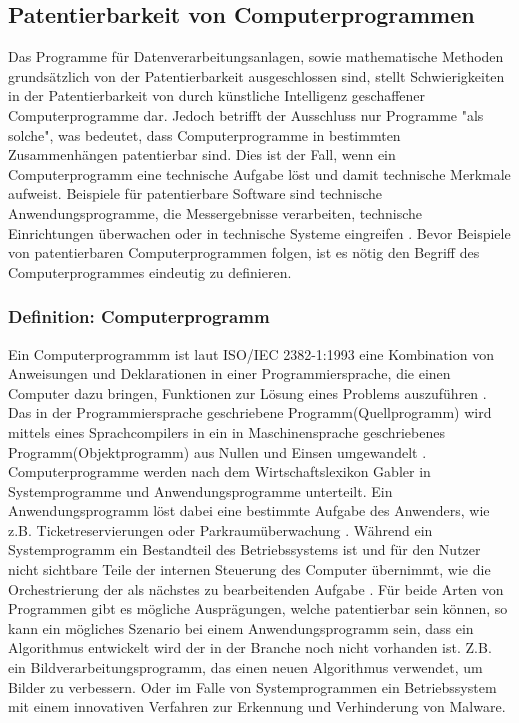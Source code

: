 \subsection{Patentierbarkeit von Computerprogrammen}
Das Programme für Datenverarbeitungsanlagen, sowie mathematische Methoden grundsätzlich
von der Patentierbarkeit ausgeschlossen sind, stellt Schwierigkeiten in der 
Patentierbarkeit von durch künstliche
Intelligenz geschaffener Computerprogramme dar. 
Jedoch betrifft der Ausschluss nur Programme "als solche", 
was bedeutet, 
dass Computerprogramme in bestimmten Zusammenhängen patentierbar sind.
Dies ist der Fall,
wenn ein Computerprogramm eine technische Aufgabe löst
und damit technische Merkmale aufweist.
Beispiele für patentierbare Software sind technische Anwendungsprogramme, 
die Messergebnisse verarbeiten, 
technische Einrichtungen überwachen oder in technische Systeme eingreifen
\cite{RedekerITRechtSchutz}.
Bevor Beispiele von patentierbaren Computerprogrammen folgen, ist es
nötig den Begriff des Computerprogrammes eindeutig zu definieren.
\subsubsection{Definition: Computerprogramm}
Ein Computerprogrammm ist laut ISO/IEC 2382-1:1993 
eine Kombination von Anweisungen und Deklarationen in einer
Programmiersprache, die einen Computer dazu bringen, 
Funktionen zur Lösung eines Problems auszuführen 
\cite{instituteofelectricalandelectronicsengineersinc.ISO47652010}.
Das in der Programmiersprache geschriebene Programm(Quellprogramm) wird 
mittels eines Sprachcompilers in ein in Maschinensprache geschriebenes 
Programm(Objektprogramm) aus Nullen und Einsen umgewandelt \cite{WasIstProgramm}.
Computerprogramme werden nach dem Wirtschaftslexikon Gabler in Systemprogramme
und Anwendungsprogramme unterteilt. 
Ein Anwendungsprogramm löst dabei eine bestimmte Aufgabe des Anwenders, 
wie z.B. Ticketreservierungen oder Parkraumüberwachung 
\cite{lackesDefinitionAnwendungsprogramm}. 
Während ein Systemprogramm ein Bestandteil des Betriebssystems ist und 
für den Nutzer nicht sichtbare Teile der internen Steuerung des Computer übernimmt,
wie die Orchestrierung der als nächstes 
zu bearbeitenden Aufgabe \cite{lackesDefinitionSystemprogramm}.
Für beide Arten von Programmen gibt es mögliche Ausprägungen, 
welche patentierbar sein können, 
so kann ein mögliches Szenario bei einem Anwendungsprogramm sein,
dass ein Algorithmus entwickelt wird der in der Branche noch nicht vorhanden ist. 
Z.B. ein
Bildverarbeitungsprogramm, das einen neuen Algorithmus verwendet, 
um Bilder zu verbessern.
Oder im Falle von Systemprogrammen ein Betriebssystem mit einem 
innovativen Verfahren zur Erkennung und Verhinderung von Malware.
